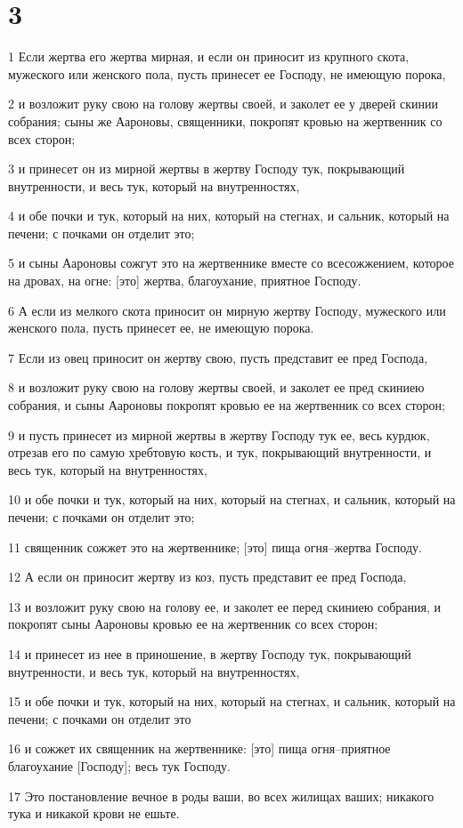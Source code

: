 \chapter{3}

\par 1 Если жертва его жертва мирная, и если он приносит из крупного скота, мужеского или женского пола, пусть принесет ее Господу, не имеющую порока,
\par 2 и возложит руку свою на голову жертвы своей, и заколет ее у дверей скинии собрания; сыны же Аароновы, священники, покропят кровью на жертвенник со всех сторон;
\par 3 и принесет он из мирной жертвы в жертву Господу тук, покрывающий внутренности, и весь тук, который на внутренностях,
\par 4 и обе почки и тук, который на них, который на стегнах, и сальник, который на печени; с почками он отделит это;
\par 5 и сыны Аароновы сожгут это на жертвеннике вместе со всесожжением, которое на дровах, на огне: [это] жертва, благоухание, приятное Господу.
\par 6 А если из мелкого скота приносит он мирную жертву Господу, мужеского или женского пола, пусть принесет ее, не имеющую порока.
\par 7 Если из овец приносит он жертву свою, пусть представит ее пред Господа,
\par 8 и возложит руку свою на голову жертвы своей, и заколет ее пред скиниею собрания, и сыны Аароновы покропят кровью ее на жертвенник со всех сторон;
\par 9 и пусть принесет из мирной жертвы в жертву Господу тук ее, весь курдюк, отрезав его по самую хребтовую кость, и тук, покрывающий внутренности, и весь тук, который на внутренностях,
\par 10 и обе почки и тук, который на них, который на стегнах, и сальник, который на печени; с почками он отделит это;
\par 11 священник сожжет это на жертвеннике; [это] пища огня--жертва Господу.
\par 12 А если он приносит жертву из коз, пусть представит ее пред Господа,
\par 13 и возложит руку свою на голову ее, и заколет ее перед скиниею собрания, и покропят сыны Аароновы кровью ее на жертвенник со всех сторон;
\par 14 и принесет из нее в приношение, в жертву Господу тук, покрывающий внутренности, и весь тук, который на внутренностях,
\par 15 и обе почки и тук, который на них, который на стегнах, и сальник, который на печени; с почками он отделит это
\par 16 и сожжет их священник на жертвеннике: [это] пища огня--приятное благоухание [Господу]; весь тук Господу.
\par 17 Это постановление вечное в роды ваши, во всех жилищах ваших; никакого тука и никакой крови не ешьте.

